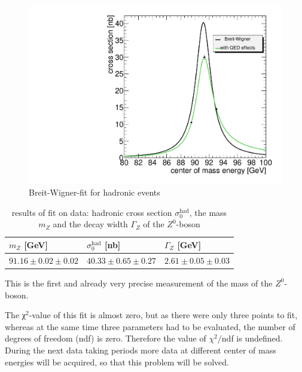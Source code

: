 \documentclass[epj,nopacs]{svjour}
\begin{document}
\begin{figure}[htb]
 \centering
 \includegraphics[width=1\columnwidth,keepaspectratio]{finalhad_fit}
 \caption{Breit-Wigner-fit for hadronic events}
 \label{fig:fit_hadrons}
\end{figure}

\begin{table}[h]
\begin{center}
\begin{tabular}{|l|l|l|}
\hline
$m_Z$ [\si{\GeV}] & $σ_0^{\mathrm{had}}$  [\si{\nano\barn}] & $Γ_Z$ [\si{\GeV}]\\
\hline
$91.16 \pm 0.02 \pm 0.02$ & $40.33 \pm 0.65 \pm 0.27$ & $2.61 \pm 0.05 \pm 0.03$\\
\hline
\end{tabular}
\vspace*{0.3cm}
\caption{\baselineskip=0.38cm results of fit on data: hadronic cross section $σ_0^{\mathrm{had}}$, the mass $m_Z$ and the decay width $Γ_Z$ of the $Z^0$-boson}
\label{tab:results}
\end{center}
\vspace*{-0.5cm}
\end{table}
This is the first and already very precise measurement of the mass of the $Z^0$-boson. 

The χ$^2$-value of this fit is almost zero, but as there were only three points to fit, whereas at the same time three parameters had to be evaluated, the number of degrees of freedom (ndf) is zero. Therefore the value of $χ^2/$ndf is undefined. During the next data taking periods more data at different center of mass energies will be acquired, so that this problem will be solved.
\end{document}

